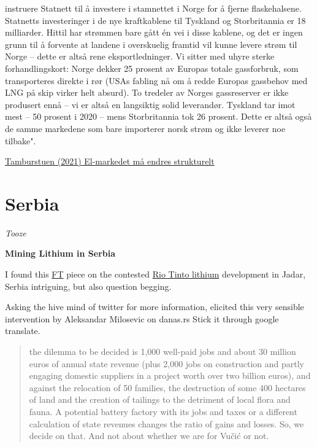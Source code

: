 \documentclass[
]{book}
\begin{document}
instruere Statnett til å investere i stamnettet i Norge for å fjerne flaskehalsene.
Statnetts investeringer i de nye kraftkablene til Tyskland og Storbritannia er 18 milliarder. Hittil har strømmen bare gått én vei i disse kablene, og det er ingen grunn til å forvente at landene i overskuelig framtid vil kunne levere strøm til Norge -- dette er altså rene eksportledninger.
Vi sitter med uhyre sterke forhandlingskort:
Norge dekker 25 prosent av Europas totale gassforbruk, som transporteres direkte i rør (USAs fabling nå om å redde Europas gassbehov med LNG på skip virker helt absurd).
To tredeler av Norges gassreserver er ikke produsert ennå -- vi er altså en langsiktig solid leverandør.
Tyskland tar imot mest -- 50 prosent i 2020 -- mens Storbritannia tok 26 prosent. Dette er altså også de samme markedene som bare importerer norsk strøm og ikke leverer noe tilbake".

\href{https://www.dagensperspektiv.no/2021/el-markedet-ma-endres-strukturelt}{Tamburstuen (2021) El-markedet må endres strukturelt}

\hypertarget{serbia}{%
\chapter{Serbia}\label{serbia}}

\emph{Tooze}

\textbf{Mining Lithium in Serbia}

I found this \href{https://www.ft.com/content/707e7a39-f357-484a-8efc-b0b7dc475600}{FT} piece on the contested \href{https://www.riotinto.com/en/operations/projects/jadar}{Rio Tinto lithium} development in Jadar, Serbia intriguing, but also question begging.

Asking the hive mind of twitter for more information, elicited this very sensible intervention by Aleksandar Milosevic on danas.rs Stick it through google translate.

\begin{quote}
the dilemma to be decided is 1,000 well-paid jobs and about 30 million euros of annual state revenue (plus 2,000 jobs on construction and partly engaging domestic suppliers in a project worth over two billion euros), and against the relocation of 50 families, the destruction of some 400 hectares of land and the creation of tailings to the detriment of local flora and fauna. A potential battery factory with its jobs and taxes or a different calculation of state revenues changes the ratio of gains and losses. So, we decide on that. And not about whether we are for Vučić or not.
\end{quote}
\end{document}
